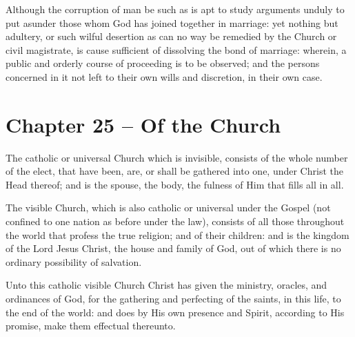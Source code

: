 \begin{outerlst}[left=0pt,labelsep=0pt]
\begin{innerlst}[resume*]
\item Although the corruption of man be such as is apt to study arguments unduly to put asunder those whom God has joined together in marriage: yet nothing but adultery, or such wilful desertion as can no way be remedied by the Church or civil magistrate, is cause sufficient of dissolving the bond of marriage: wherein, a public and orderly course of proceeding is to be observed; and the persons concerned in it not left to their own wills and discretion, in their own case.  
\end{innerlst}

\item
{}
\section{Chapter 25 -- Of the Church}
\begin{innerlst}[resume*]

\item The catholic or universal Church which is invisible, consists of the whole number of the elect, that have been, are, or shall be gathered into one, under Christ the Head thereof; and is the spouse, the body, the fulness of Him that fills all in all.   

\item The visible Church, which is also catholic or universal under the Gospel (not confined to one nation as before under the law), consists of all those throughout the world that profess the true religion; and of their children: and is the kingdom of the Lord Jesus Christ, the house and family of God, out of which there is no ordinary possibility of salvation.   

\item Unto this catholic visible Church Christ has given the ministry, oracles, and ordinances of God, for the gathering and perfecting of the saints, in this life, to the end of the world: and does by His own presence and Spirit, according to His promise, make them effectual thereunto.   


\end{innerlst}
\end{outerlst}
